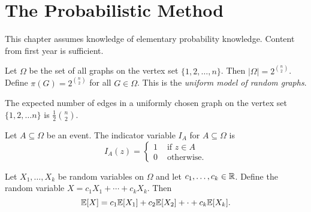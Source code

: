 \chapter{The Probabilistic Method}

This chapter assumes knowledge of elementary probability knowledge. Content from first year is sufficient.

\begin{example}
    Let \(\Omega\) be the set of all graphs on the vertex set \(\{1, 2, \dots, n\}\). Then \(|\Omega| = 2^{\binom{n}{2}}\). Define \(\pi(G) = 2^{\binom{n}{2}}\) for all \(G \in \Omega\). This is the \textit{uniform model of random graphs}.
\end{example}

\begin{lemma}
    The expected number of edges in a uniformly chosen graph on the vertex set \(\{1, 2, \dots n\}\) is \(\frac{1}{2}\binom{n}{2}\).
\end{lemma}

Let \(A \subseteq \Omega\) be an event. The indicator variable \(I_A\) for \(A \subseteq \Omega\) is
\[I_A(z) = \begin{cases}
        1 & \text{ if } z \in A \\
        0 & \text{ otherwise.}
    \end{cases}\]

\begin{definition}
    Let \(X_1, \dots, X_k\) be random variables on \(\Omega\) and let \(c_1, \dots, c_k \in \mathbb{R}\). Define the random variable \(X = c_1X_1 + \cdots + c_k X_k\). Then
    \[\mathbb{E}[X] = c_1\mathbb{E}[X_1] + c_2\mathbb{E}[X_2] + \cdot + c_k\mathbb{E}[X_k].\]
\end{definition}

